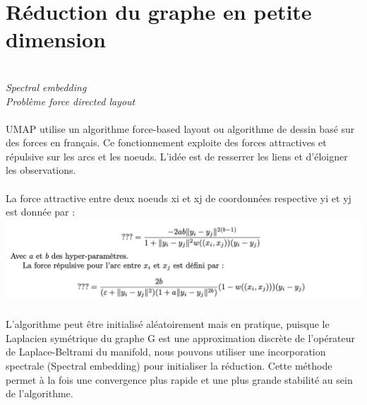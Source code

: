     \section{Réduction du graphe en petite dimension}
        \textit{
        \\
        Spectral embedding
        \\
        Problème force directed layout
        }
        \\
        \\
        UMAP utilise un algorithme force-based layout ou algorithme de dessin basé sur des forces en français. Ce fonctionnement exploite des forces attractives et répulsive sur les arcs et les noeuds. L’idée est de resserrer les liens et d’éloigner les observations.
        \\
        \\
        La force attractive entre deux noeuds xi et xj de coordonnées respective yi et yj est donnée par :
        \\
        \includegraphics[width=\linewidth]{./img/umap/reduction_dim}
        \\
        \\
        L'algorithme peut être initialisé aléatoirement mais en pratique, puisque le Laplacien symétrique du graphe G est une approximation discrète de l'opérateur de Laplace-Beltrami du manifold, nous pouvons utiliser une incorporation spectrale (Spectral embedding) pour initialiser la réduction. Cette méthode permet à la fois une convergence plus rapide et une plus grande stabilité au sein de l'algorithme.




